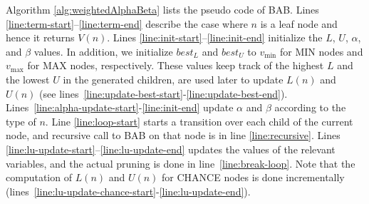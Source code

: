 \documentclass[runningheads]{llncs}
\newcommand{\MM}{\mathit{V}}
\newcommand{\pess}{\mathit{L}}
\newcommand{\opti}{\mathit{U}}
\newcommand{\besto}{\mathit{best}_{\opti}}
\newcommand{\bestp}{\mathit{best}_{\pess}}
\newcommand{\vmax}{v_{\text{max}}}
\newcommand{\vmin}{v_{\text{min}}}
\begin{document}


Algorithm \ref{alg:weightedAlphaBeta} lists the pseudo code of BAB. %
Lines \ref{line:term-start}--\ref{line:term-end} describe the case where $n$ is a leaf node and hence it returns $\MM(n)$. %
Lines \ref{line:init-start}--\ref{line:init-end} initialize the $\pess$, $\opti$, $\alpha$, and $\beta$ values. In addition, we 
initialize $\bestp$ and $\besto$ to $\vmin{}$ for MIN nodes and $\vmax{}$ for MAX nodes, respectively. These values keep track of the highest $\pess{}$ and the lowest $\opti{}$ in the generated children, are used later to update $\pess(n)$ and $\opti(n)$ (see lines~\ref{line:update-best-start}-\ref{line:update-best-end}). 
Lines~\ref{line:alpha-update-start}-\ref{line:init-end} update $\alpha$ and $\beta$ according to the type of $n$. 
Line \ref{line:loop-start} starts a transition over each child of the current node, and recursive call to BAB on that node is 
in line \ref{line:recursive}. Lines \ref{line:lu-update-start}--\ref{line:lu-update-end} updates 
the values of the relevant variables, and the actual pruning is done in line~\ref{line:break-loop}. 
Note that the computation of $\pess(n)$ and $\opti(n)$ for CHANCE nodes is done incrementally (lines~\ref{line:lu-update-chance-start}-\ref{line:lu-update-end}). 
\end{document}
